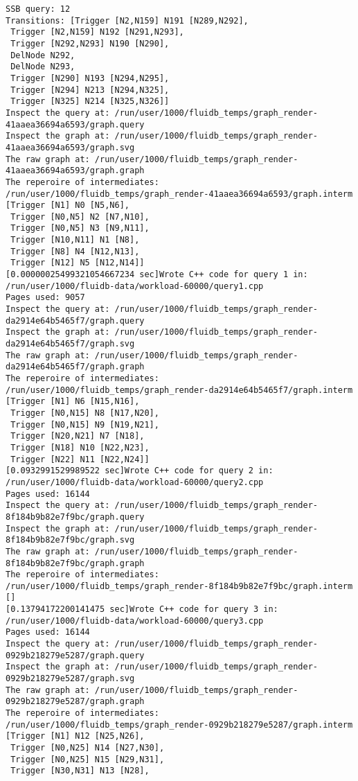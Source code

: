\begin{code}
\begin{verbatim}
SSB query: 12
Transitions: [Trigger [N2,N159] N191 [N289,N292],
 Trigger [N2,N159] N192 [N291,N293],
 Trigger [N292,N293] N190 [N290],
 DelNode N292,
 DelNode N293,
 Trigger [N290] N193 [N294,N295],
 Trigger [N294] N213 [N294,N325],
 Trigger [N325] N214 [N325,N326]]
Inspect the query at: /run/user/1000/fluidb_temps/graph_render-41aaea36694a6593/graph.query
Inspect the graph at: /run/user/1000/fluidb_temps/graph_render-41aaea36694a6593/graph.svg
The raw graph at: /run/user/1000/fluidb_temps/graph_render-41aaea36694a6593/graph.graph
The reperoire of intermediates: /run/user/1000/fluidb_temps/graph_render-41aaea36694a6593/graph.interm
[Trigger [N1] N0 [N5,N6],
 Trigger [N0,N5] N2 [N7,N10],
 Trigger [N0,N5] N3 [N9,N11],
 Trigger [N10,N11] N1 [N8],
 Trigger [N8] N4 [N12,N13],
 Trigger [N12] N5 [N12,N14]]
[0.00000025499321054667234 sec]Wrote C++ code for query 1 in: /run/user/1000/fluidb-data/workload-60000/query1.cpp
Pages used: 9057
Inspect the query at: /run/user/1000/fluidb_temps/graph_render-da2914e64b5465f7/graph.query
Inspect the graph at: /run/user/1000/fluidb_temps/graph_render-da2914e64b5465f7/graph.svg
The raw graph at: /run/user/1000/fluidb_temps/graph_render-da2914e64b5465f7/graph.graph
The reperoire of intermediates: /run/user/1000/fluidb_temps/graph_render-da2914e64b5465f7/graph.interm
[Trigger [N1] N6 [N15,N16],
 Trigger [N0,N15] N8 [N17,N20],
 Trigger [N0,N15] N9 [N19,N21],
 Trigger [N20,N21] N7 [N18],
 Trigger [N18] N10 [N22,N23],
 Trigger [N22] N11 [N22,N24]]
[0.0932991529989522 sec]Wrote C++ code for query 2 in: /run/user/1000/fluidb-data/workload-60000/query2.cpp
Pages used: 16144
Inspect the query at: /run/user/1000/fluidb_temps/graph_render-8f184b9b82e7f9bc/graph.query
Inspect the graph at: /run/user/1000/fluidb_temps/graph_render-8f184b9b82e7f9bc/graph.svg
The raw graph at: /run/user/1000/fluidb_temps/graph_render-8f184b9b82e7f9bc/graph.graph
The reperoire of intermediates: /run/user/1000/fluidb_temps/graph_render-8f184b9b82e7f9bc/graph.interm
[]
[0.13794172200141475 sec]Wrote C++ code for query 3 in: /run/user/1000/fluidb-data/workload-60000/query3.cpp
Pages used: 16144
Inspect the query at: /run/user/1000/fluidb_temps/graph_render-0929b218279e5287/graph.query
Inspect the graph at: /run/user/1000/fluidb_temps/graph_render-0929b218279e5287/graph.svg
The raw graph at: /run/user/1000/fluidb_temps/graph_render-0929b218279e5287/graph.graph
The reperoire of intermediates: /run/user/1000/fluidb_temps/graph_render-0929b218279e5287/graph.interm
[Trigger [N1] N12 [N25,N26],
 Trigger [N0,N25] N14 [N27,N30],
 Trigger [N0,N25] N15 [N29,N31],
 Trigger [N30,N31] N13 [N28],

\end{verbatim}
\end{code}
